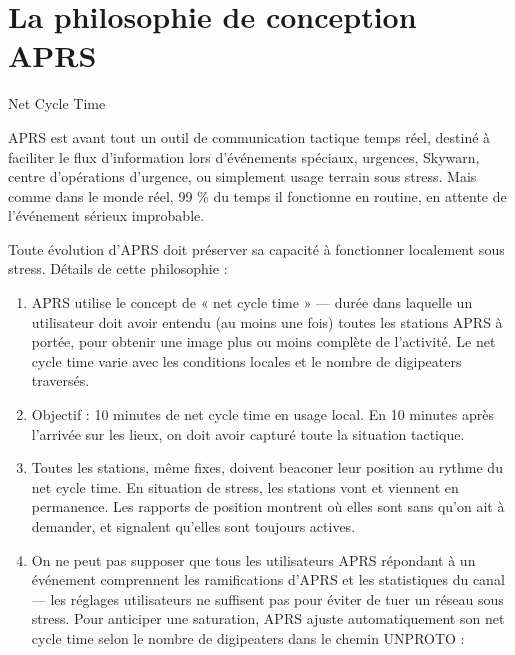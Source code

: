 \chapter[LA PHILOSOPHIE DE CONCEPTION APRS]{La philosophie de conception
APRS}\label{la-philosophie-de-conception-aprs}

\begin{aprssideblock}{Net Cycle Time}
\label{net-cycle-time}
APRS est avant tout un outil de communication tactique temps réel,
destiné à faciliter le flux d'information lors d'événements spéciaux,
urgences, Skywarn, centre d'opérations d'urgence, ou simplement usage
terrain sous stress. Mais comme dans le monde réel, 99 \% du temps il
fonctionne en routine, en attente de l'événement sérieux improbable.

Toute évolution d'APRS doit préserver sa capacité à fonctionner
localement sous stress. Détails de cette philosophie :

\begin{enumerate}
\def\labelenumi{\arabic{enumi}.}
\item
  APRS utilise le concept de « net cycle time » --- durée dans laquelle
  un utilisateur doit avoir entendu (au moins une fois) toutes les
  stations APRS à portée, pour obtenir une image plus ou moins complète
  de l'activité. Le net cycle time varie avec les conditions locales et
  le nombre de digipeaters traversés.
\item
  Objectif : 10 minutes de net cycle time en usage local. En 10 minutes
  après l'arrivée sur les lieux, on doit avoir capturé toute la
  situation tactique.
\item
  Toutes les stations, même fixes, doivent beaconer leur position au
  rythme du net cycle time. En situation de stress, les stations vont et
  viennent en permanence. Les rapports de position montrent où elles
  sont sans qu'on ait à demander, et signalent qu'elles sont toujours
  actives.
\item
  On ne peut pas supposer que tous les utilisateurs APRS répondant à un
  événement comprennent les ramifications d'APRS et les statistiques du
  canal --- les réglages utilisateurs ne suffisent pas pour éviter de
  tuer un réseau sous stress. Pour anticiper une saturation, APRS ajuste
  automatiquement son net cycle time selon le nombre de digipeaters dans
  le chemin UNPROTO :


\end{enumerate}
\end{aprssideblock}

